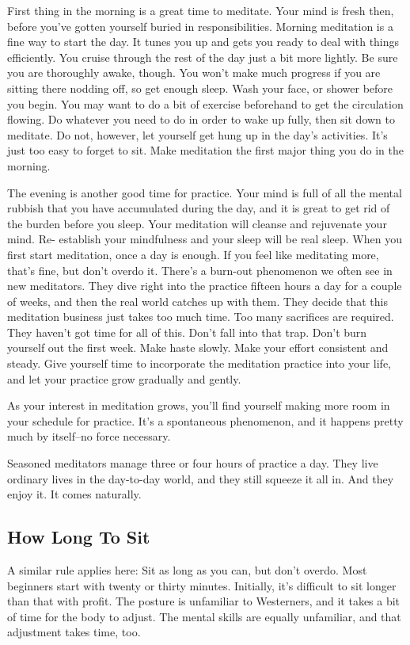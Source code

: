 First thing in the morning is a great time to meditate. Your mind is fresh then,
before you've gotten yourself buried in responsibilities. Morning meditation is
a fine way to start the day. It tunes you up and gets you ready to deal with
things efficiently. You cruise through the rest of the day just a bit more
lightly. Be sure you are thoroughly awake, though. You won't make much progress
if you are sitting there nodding off, so get enough sleep. Wash your face, or
shower before you begin. You may want to do a bit of exercise beforehand to get
the circulation flowing. Do whatever you need to do in order to wake up fully,
then sit down to meditate. Do not, however, let yourself get hung up in the
day's activities. It's just too easy to forget to sit. Make meditation the first
major thing you do in the morning.

The evening is another good time for practice. Your mind is full of all the
mental rubbish that you have accumulated during the day, and it is great to get
rid of the burden before you sleep. Your meditation will cleanse and rejuvenate
your mind. Re- establish your mindfulness and your sleep will be real sleep.
When you first start meditation, once a day is enough. If you feel like
meditating more, that's fine, but don't overdo it. There's a burn-out phenomenon
we often see in new meditators. They dive right into the practice fifteen hours
a day for a couple of weeks, and then the real world catches up with them. They
decide that this meditation business just takes too much time. Too many
sacrifices are required. They haven't got time for all of this. Don't fall into
that trap. Don't burn yourself out the first week. Make haste slowly. Make your
effort consistent and steady. Give yourself time to incorporate the meditation
practice into your life, and let your practice grow gradually and gently.

As your interest in meditation grows, you'll find yourself making more room in your schedule for practice. It's a spontaneous
phenomenon, and it happens pretty much by itself--no force necessary.

Seasoned meditators manage three or four hours of practice a day. They live
ordinary lives in the day-to-day world, and they still squeeze it all in. And
they enjoy it. It comes naturally.

\subsection*{How Long To Sit}
A similar rule applies here: Sit as long as you can, but don't
overdo. Most beginners start with twenty or thirty minutes. Initially, it's
difficult to sit longer than that with profit. The posture is unfamiliar to
Westerners, and it takes a bit of time for the body to adjust. The mental skills
are equally unfamiliar, and that adjustment takes time, too.

